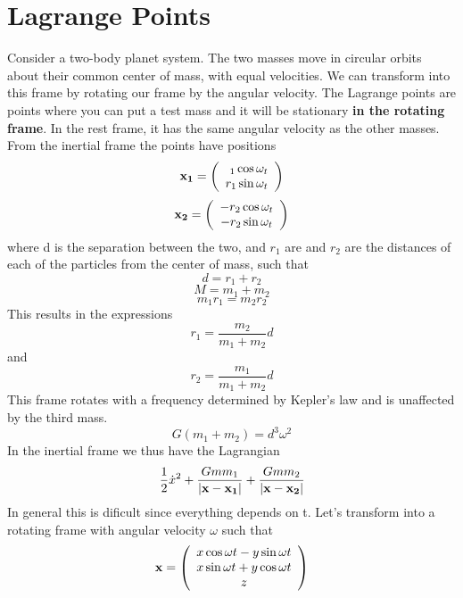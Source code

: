 \section{Lagrange Points}
Consider a two-body planet system. The two masses move in circular
orbits about their common center of mass, with equal velocities. We
can transform into this frame by rotating our frame by the angular
velocity. The Lagrange points are points where you can put a test
mass and it will be stationary \textbf{in the rotating frame}. In the
rest frame, it has the same angular velocity as the other
masses. From the inertial frame the points have positions
\begin{equation}
\v{x_1} = \left(\begin{array} r_1 \cos\omega_t \\ r_1 \sin \omega_t \end{array}\right)
\end{equation}
\begin{equation}
\mathbf{x_2} = \left(\begin{array}{c} -r_2 \cos\omega_t \\ -r_2 \sin \omega_t \end{array}\right)
\end{equation}
where d is the separation between the two, and $r_1$ are and $r_2$ are the distances of each of the particles from the center of mass, such that 
\begin{equation}
d = r_1 + r_2
\end{equation}
\begin{equation}
M = m_1 + m_2
\end{equation}
\begin{equation}
m_1 r_1 = m_2 r_2
\end{equation}
This results in the expressions
\begin{equation}
r_1 = \frac{m_2}{m_1 + m_2} d
\end{equation}
and
\begin{equation}
r_2 = \frac{m_1}{m_1 + m_2} d
\end{equation}
This frame rotates with a frequency determined by Kepler's law and is unaffected by the third mass. 
\begin{equation}
G (m_1 + m_2) = d^3 \omega^2
\end{equation}
In the inertial frame we thus have the Lagrangian
\begin{equation}
\frac{1}{2} \dot{x}^2 + \frac{Gm m_1}{|\mathbf{x} - \mathbf{x_1}|}
+ \frac{Gmm_2}{|\mathbf{x} - \mathbf{x_2}|}
\end{equation}
In general this is dificult since everything depends on t. Let's transform into a rotating frame with angular velocity $\omega$ such that
\begin{equation}
\mathbf{x} = \left( \begin{array}{c} x\cos\omega t - y\sin \omega t \\
x \sin \omega t + y \cos \omega t \\ z\end{array} \right)
\end{equation}

